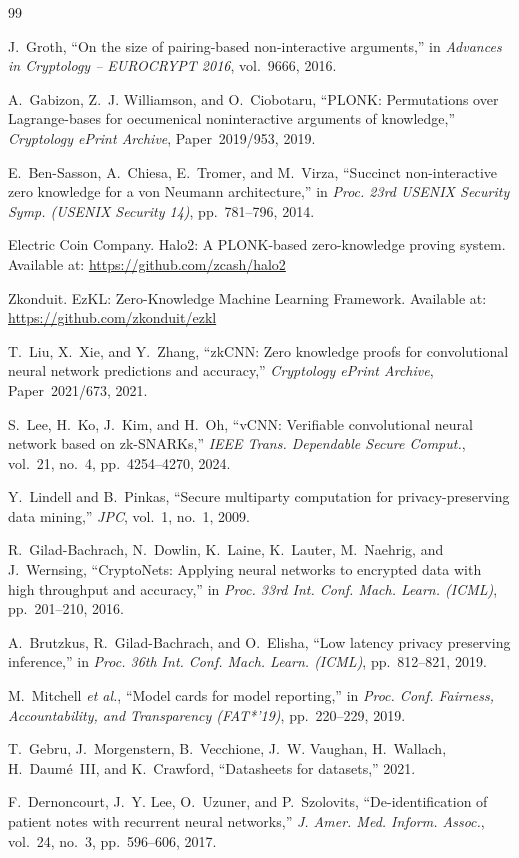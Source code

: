 \documentclass[10pt,conference,a4paper]{IEEEtran}
\begin{document}
\begin{thebibliography}{99}

J.~Groth, ``On the size of pairing-based non-interactive arguments,'' in \emph{Advances in Cryptology -- EUROCRYPT 2016}, vol.~9666, 2016.

A.~Gabizon, Z.~J. Williamson, and O.~Ciobotaru, ``PLONK: Permutations over Lagrange-bases for oecumenical noninteractive arguments of knowledge,'' \emph{Cryptology ePrint Archive}, Paper~2019/953, 2019.

E.~Ben-Sasson, A.~Chiesa, E.~Tromer, and M.~Virza, ``Succinct non-interactive zero knowledge for a von Neumann architecture,'' in \emph{Proc. 23rd USENIX Security Symp. (USENIX Security 14)}, pp.~781--796, 2014.

Electric Coin Company.
\newblock Halo2: A PLONK-based zero-knowledge proving system.
\newblock Available at: \url{https://github.com/zcash/halo2}

Zkonduit.
\newblock EzKL: Zero-Knowledge Machine Learning Framework.
\newblock Available at: \url{https://github.com/zkonduit/ezkl}

T.~Liu, X.~Xie, and Y.~Zhang, ``zkCNN: Zero knowledge proofs for convolutional neural network predictions and accuracy,'' \emph{Cryptology ePrint Archive}, Paper~2021/673, 2021.

S.~Lee, H.~Ko, J.~Kim, and H.~Oh, ``vCNN: Verifiable convolutional neural network based on zk-SNARKs,'' \emph{IEEE Trans. Dependable Secure Comput.}, vol.~21, no.~4, pp.~4254--4270, 2024.

Y.~Lindell and B.~Pinkas, ``Secure multiparty computation for privacy-preserving data mining,'' \emph{JPC}, vol.~1, no.~1, 2009.

R.~Gilad-Bachrach, N.~Dowlin, K.~Laine, K.~Lauter, M.~Naehrig, and J.~Wernsing, ``CryptoNets: Applying neural networks to encrypted data with high throughput and accuracy,'' in \emph{Proc. 33rd Int. Conf. Mach. Learn. (ICML)}, pp.~201--210, 2016.

A.~Brutzkus, R.~Gilad-Bachrach, and O.~Elisha, ``Low latency privacy preserving inference,'' in \emph{Proc. 36th Int. Conf. Mach. Learn. (ICML)}, pp.~812--821, 2019.

M.~Mitchell \emph{et al.}, ``Model cards for model reporting,'' in \emph{Proc. Conf. Fairness, Accountability, and Transparency (FAT*'19)}, pp.~220--229, 2019.

T.~Gebru, J.~Morgenstern, B.~Vecchione, J.~W. Vaughan, H.~Wallach, H.~Daum{\'e}~III, and K.~Crawford, ``Datasheets for datasets,'' 2021.

F.~Dernoncourt, J.~Y. Lee, O.~Uzuner, and P.~Szolovits, ``De-identification of patient notes with recurrent neural networks,'' \emph{J. Amer. Med. Inform. Assoc.}, vol.~24, no.~3, pp.~596--606, 2017.

\end{thebibliography}
\end{document}
